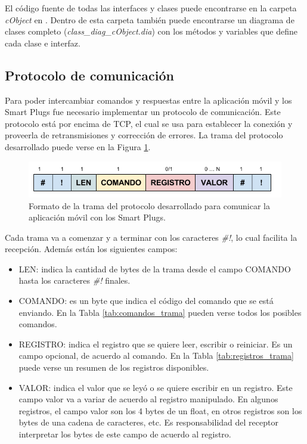 El código fuente de todas las interfaces y clases puede encontrarse en la carpeta \textit{cObject} en \citep{repo_firmware}. Dentro de esta carpeta también puede encontrarse un diagrama de clases completo (\textit{class\_diag\_cObject.dia}) con los métodos y variables que define cada clase e interfaz.


\subsection{Protocolo de comunicación}
\label{subsection:protocolo}

Para poder intercambiar comandos y respuestas entre la aplicación móvil y los Smart Plugs fue necesario implementar un protocolo de comunicación. Este protocolo está por encima de TCP, el cual se usa para establecer la conexión y proveerla de retransmisiones y corrección de errores. La trama del protocolo desarrollado puede verse en la Figura \ref{fig:formato_trama}. 

\begin{figure}[h]
	\centering
	\includegraphics[width=13cm]{./Figures/3_2_4_formato_trama.png}
	\caption{Formato de la trama del protocolo desarrollado para comunicar la aplicación móvil con los Smart Plugs.}
	\label{fig:formato_trama}
\end{figure}

Cada trama va a comenzar y a terminar con los caracteres \textit{\#!}, lo cual facilita la recepción. Además están los siguientes campos:

\begin{itemize}
\item LEN: indica la cantidad de bytes de la trama desde el campo COMANDO hasta los caracteres \textit{\#!} finales.
\item COMANDO: es un byte que indica el código del comando que se está enviando. En la Tabla \ref{tab:comandos_trama} pueden verse todos los posibles comandos.
\item REGISTRO: indica el registro que se quiere leer, escribir o reiniciar. Es un campo opcional, de acuerdo al comando. En la Tabla \ref{tab:registros_trama} puede verse un resumen de los registros disponibles.
\item VALOR: indica el valor que se leyó o se quiere escribir en un registro. Este campo valor va a variar de acuerdo al registro manipulado. En algunos registros, el campo valor son los 4 bytes de un float, en otros registros son los bytes de una cadena de caracteres, etc. Es responsabilidad del receptor interpretar los bytes de este campo de acuerdo al registro.
\end{itemize}



